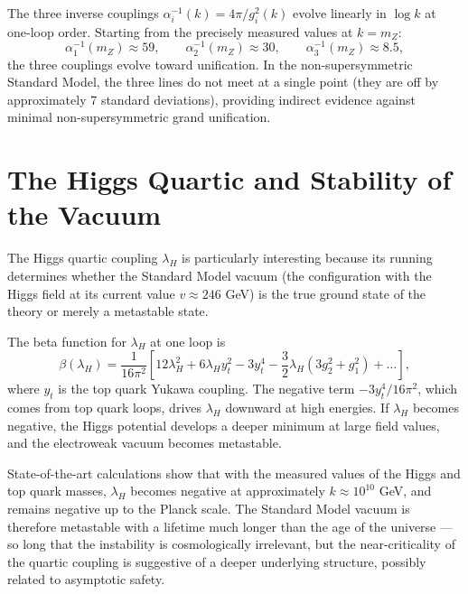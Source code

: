 \documentclass[11pt, twoside, openright]{book}
\theoremstyle{dotted}
\theoremstyle{definition}
\begin{document}
The three inverse couplings $\alpha_i^{-1}(k) = 4\pi/g_i^2(k)$ evolve linearly
in $\log k$ at one-loop order. Starting from the precisely measured values at
$k = m_Z$:
\begin{equation}
  \alpha_1^{-1}(m_Z) \approx 59, \qquad
  \alpha_2^{-1}(m_Z) \approx 30, \qquad
  \alpha_3^{-1}(m_Z) \approx 8.5,
  \label{eq:sm_couplings_mz}
\end{equation}
the three couplings evolve toward unification. In the non-supersymmetric Standard
Model, the three lines do not meet at a single point (they are off by approximately
7 standard deviations), providing indirect evidence against minimal non-supersymmetric
grand unification.

\section{The Higgs Quartic and Stability of the Vacuum}

The Higgs quartic coupling $\lambda_H$ is particularly interesting because its
running determines whether the Standard Model vacuum (the configuration with the
Higgs field at its current value $v \approx 246$ GeV) is the true ground state of
the theory or merely a metastable state.

The beta function for $\lambda_H$ at one loop is
\begin{equation}
  \beta(\lambda_H) = \frac{1}{16\pi^2}\left[12\lambda_H^2 + 6\lambda_H y_t^2
  - 3y_t^4 - \frac{3}{2}\lambda_H(3g_2^2 + g_1^2) + \ldots\right],
  \label{eq:higgs_quartic_beta}
\end{equation}
where $y_t$ is the top quark Yukawa coupling. The negative term $-3y_t^4/16\pi^2$,
which comes from top quark loops, drives $\lambda_H$ downward at high energies.
If $\lambda_H$ becomes negative, the Higgs potential develops a deeper minimum at
large field values, and the electroweak vacuum becomes metastable.

State-of-the-art calculations show that with the measured values of the Higgs and
top quark masses, $\lambda_H$ becomes negative at approximately $k \approx 10^{10}$
GeV, and remains negative up to the Planck scale. The Standard Model vacuum is
therefore metastable with a lifetime much longer than the age of the universe ---
so long that the instability is cosmologically irrelevant, but the near-criticality
of the quartic coupling is suggestive of a deeper underlying structure, possibly
related to asymptotic safety.

\end{document}
